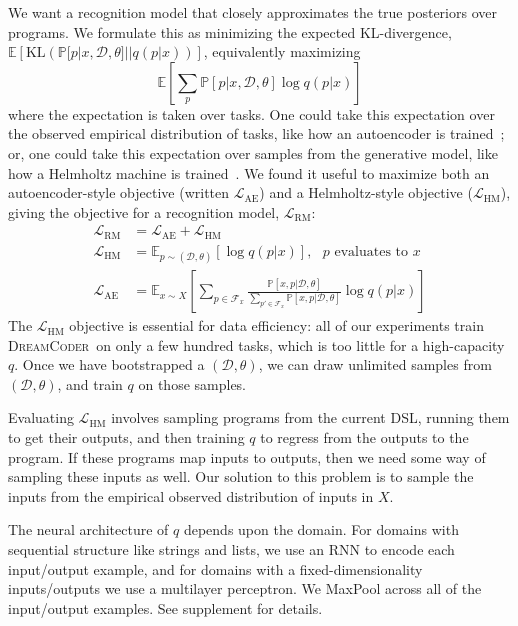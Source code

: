 \documentclass{article}
\newcommand{\system}{\textsc{DreamCoder}~}
\newcommand{\expect}{\mathds{E}} %
\newcommand{\probability}{\mathds{P}} %
\begin{document}
We want a recognition model that closely approximates the true posteriors over programs. We formulate this as minimizing the expected KL-divergence, $  \expect\left[\text{KL}\left(\probability[p|x,\mathcal{D},\theta]||q(p|x) \right) \right]$,
equivalently maximizing
\begin{equation*}
  \expect\left[\sum_p\probability[p|x,\mathcal{D},\theta]\log q(p|x) \right]
\end{equation*}
where the expectation is taken over tasks. One could take this expectation
over the observed empirical distribution of tasks,
like how an autoencoder is trained~\cite{hinton2006reducing}; or, one could take this expectation over samples from the generative model, like how a Helmholtz machine is trained~\cite{dayan1995helmholtz}.
We found it useful to maximize both an autoencoder-style objective (written $\mathcal{L}_{\text{AE}}$) and a Helmholtz-style objective ($\mathcal{L}_{\text{HM}}$), giving the  objective for a recognition model, $\mathcal{L}_{\text{RM}}$:
\begin{align}
\mathcal{L}_{\text{RM}}& = \mathcal{L}_\text{AE} + \mathcal{L}_\text{HM}\\
\mathcal{L}_{\text{HM}}& = \expect_{p\sim(\mathcal{D},\theta) }\left[\log q(p|x)\right],\text{ $p$ evaluates to $x$}\nonumber\\
\mathcal{L}_{\text{AE}}& = \expect_{x\sim X}\left[\sum_{p\in \mathcal{F}_x}
  \frac{\probability\left[x,p|\mathcal{D},\theta \right]}{\sum_{p'\in \mathcal{F}_x}\probability\left[x,p|\mathcal{D},\theta \right]}\log q(p|x)\right]\nonumber
\end{align}
The $\mathcal{L}_{\text{HM}}$ objective is essential for data efficiency:
all of our experiments train \system on only a few hundred tasks, which is too little for
a high-capacity $q$.
Once we have bootstrapped a $(\mathcal{D},\theta)$,
we can draw unlimited samples from $(\mathcal{D},\theta)$,
and train $q$ on those samples.

Evaluating $\mathcal{L}_{\text{HM}}$ involves sampling programs from
the current DSL, running them to get their outputs,
and then training $q$ to regress from the outputs to the program.
If these programs map inputs to outputs,
then we need some way of sampling these inputs as well.
Our solution to this problem is to sample the inputs
from the empirical observed distribution of inputs in $X$.

The neural architecture of $q$ depends upon the domain.
For domains with sequential structure like strings and lists,
we use an RNN to encode each input/output example,
and for domains with a fixed-dimensionality inputs/outputs we use a multilayer perceptron.
We MaxPool across all of the input/output examples. See supplement for details.
\end{document}
